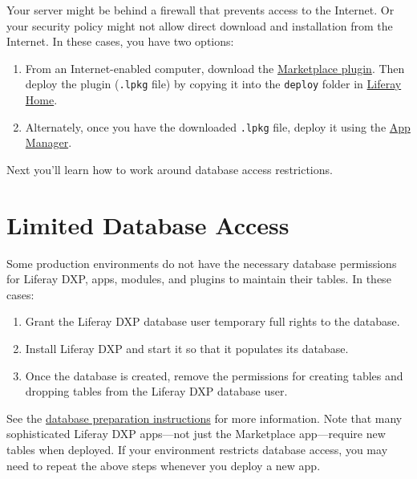 Your server might be behind a firewall that prevents access to the
Internet. Or your security policy might not allow direct download and
installation from the Internet. In these cases, you have two options:

\begin{enumerate}
\def\labelenumi{\arabic{enumi}.}
\item
  From an Internet-enabled computer, download the
  \href{https://www.liferay.com/marketplace/download}{Marketplace
  plugin}. Then deploy the plugin (\texttt{.lpkg} file) by copying it
  into the \texttt{deploy} folder in
  \href{/docs/7-2/deploy/-/knowledge_base/d/liferay-home}{Liferay Home}.
\item
  Alternately, once you have the downloaded \texttt{.lpkg} file, deploy
  it using the
  \href{/docs/7-2/user/-/knowledge_base/u/managing-and-configuring-apps}{App
  Manager}.
\end{enumerate}

Next you'll learn how to work around database access restrictions.

\section{Limited Database Access}\label{limited-database-access}

Some production environments do not have the necessary database
permissions for Liferay DXP, apps, modules, and plugins to maintain
their tables. In these cases:

\begin{enumerate}
\def\labelenumi{\arabic{enumi}.}
\item
  Grant the Liferay DXP database user temporary full rights to the
  database.
\item
  Install Liferay DXP and start it so that it populates its database.
\item
  Once the database is created, remove the permissions for creating
  tables and dropping tables from the Liferay DXP database user.
\end{enumerate}

See the
\href{/docs/7-2/deploy/-/knowledge_base/d/preparing-for-install\#limiting-database-access}{database
preparation instructions} for more information. Note that many
sophisticated Liferay DXP apps---not just the Marketplace app---require
new tables when deployed. If your environment restricts database access,
you may need to repeat the above steps whenever you deploy a new app.

